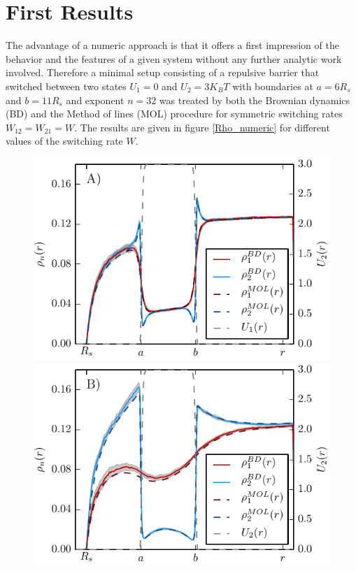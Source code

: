 \section{First Results}
The advantage of a numeric approach is that it offers a first impression of the behavior and the features of a given system without any further analytic work involved. Therefore a minimal setup consisting of a repulsive barrier that switched between two states $U_1 = 0$ and $U_2 = 3 K_B T$ with boundaries at $a = 6 R_s$ and $b = 11 R_s$ and exponent $n=32$ was treated by both the Brownian dynamics (BD) and the Method of lines (MOL) procedure for symmetric switching rates $W_{12} = W_{21} = W$. The results are given in figure \ref{Rho_numeric} for different values of the switching rate $W$. 
\begin{minipage}[t]{.66 \textwidth}
     \begin{figure}[H]
        \hspace{-1.2cm } \includegraphics[width = 1 \textwidth]{plots/rd025_numeric.pdf} \\
        \vspace{.4 cm} \hspace{-1.2cm } \includegraphics[width = 1 \textwidth]{plots/rd25_numeric.pdf} \\

\end{figure}
\end{minipage}

